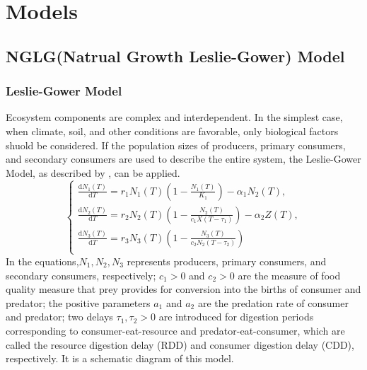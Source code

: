 \documentclass{HZNUMCM}
\begin{document}
  \section{Models}
    \subsection{NGLG(Natrual Growth Leslie-Gower) Model}
      \subsubsection{Leslie-Gower Model}
        Ecosystem components are complex and interdependent. 
        In the simplest case, when climate, soil, and other conditions are favorable, only biological factors shuold be considered. 
        If the population sizes of producers, primary consumers, and secondary consumers are used to describe the entire system, 
        the Leslie-Gower Model, as described by \cite{GUO20142850}, can be applied.
        \begin{equation}
          \left\{ \begin{array}{c}
            \frac{\mathrm{d}N_1\left( T \right)}{\mathrm{d}T}=r_1N_1\left( T \right) \left( 1-\frac{N_1\left( T \right)}{K_1} \right) -\alpha _1N_2\left( T \right) ,\\
            \frac{\mathrm{d}N_2\left( T \right)}{\mathrm{d}T}=r_2N_2\left( T \right) \left( 1-\frac{N_2\left( T \right)}{c_1X\left( T-\tau _1 \right)} \right) -\alpha _2Z\left( T \right) ,\\
            \frac{\mathrm{d}N_3\left( T \right)}{\mathrm{d}T}=r_3N_3\left( T \right) \left( 1-\frac{N_3\left( T \right)}{c_2N_2\left( T-\tau _2 \right)} \right)\\
          \end{array} \right. 
        \end{equation}
        In the equations,$N_1,N_2,N_3$ represents producers, primary consumers, and secondary consumers, respectively; 
        $c_1>0$ and $c_2>0$ are the measure of food quality measure that prey provides for conversion into the births of consumer and predator; 
        the positive parameters $a_1$ and $a_2$ are the predation rate of consumer and predator; 
        two delays $\tau_1, \tau_2>0$ are introduced for digestion periods corresponding to consumer-eat-resource and predator-eat-consumer, 
        which are called the resource digestion delay (RDD) and consumer digestion delay (CDD), respectively.
        It is a schematic diagram of this model.
\end{document}
